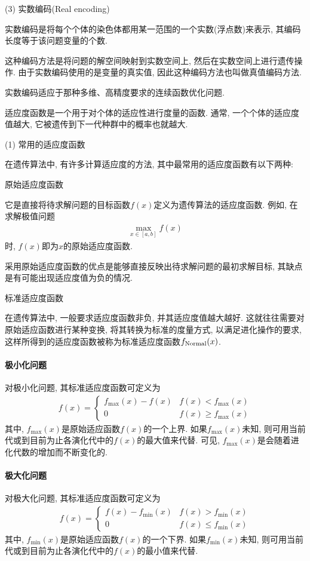  (3) 实数编码(Real encoding)


实数编码是将每个个体的染色体都用某一范围的一个实数(浮点数)来表示, 其编码长度等于该问题变量的个数.

这种编码方法是将问题的解空间映射到实数空间上, 然后在实数空间上进行遗传操作. 由于实数编码使用的是变量的真实值, 因此这种编码方法也叫做真值编码方法.

实数编码适应于那种多维、高精度要求的连续函数优化问题.

适应度函数是一个用于对个体的适应性进行度量的函数. 通常, 一个个体的适应度值越大, 它被遗传到下一代种群中的概率也就越大.

(1) 常用的适应度函数


 在遗传算法中, 有许多计算适应度的方法, 其中最常用的适应度函数有以下两种:

 原始适应度函数

 它是直接将待求解问题的目标函数$f(x)$定义为遗传算法的适应度函数. 例如, 在求解极值问题
\begin{align}
 \max _{x \in[a, b]} f(x)
\end{align}
时, $f(x)$即为$x$的原始适应度函数.

采用原始适应度函数的优点是能够直接反映出待求解问题的最初求解目标, 其缺点是有可能出现适应度值为负的情况.

 标准适应度函数

在遗传算法中, 一般要求适应度函数非负, 并其适应度值越大越好. 这就往往需要对原始适应函数进行某种变换, 将其转换为标准的度量方式, 以满足进化操作的要求, 这样所得到的适应度函数被称为标准适应度函数$f_{\textup{Normal}}(x)$.
\paragraph{极小化问题}
对极小化问题, 其标准适应度函数可定义为
\begin{align}
f(x)=
\left\{\begin{array}{ll}
{f_{\max }(x)-f(x)} &f(x)<f_{\max}(x) \\
{0} & f(x)\geq f_{\max }(x)
\end{array}
\right.
\end{align}
其中, $f_{\max}(x)$是原始适应函数$f(x)$的一个上界. 如果$f_{\max}(x)$未知, 则可用当前代或到目前为止各演化代中的$f(x)$的最大值来代替. 可见,  $f_{\max}(x)$是会随着进化代数的增加而不断变化的.
\paragraph{极大化问题}
对极大化问题, 其标准适应度函数可定义为
\begin{align}
  f(x)=\left\{
  \begin{array}{ll}
  f(x)-f_{\min }(x) &f(x)>f_{\min}(x)\\
 0 & f(x)\leq f_{\min}(x)
  \end{array}
  \right.
\end{align}
其中, $f_{\min}(x)$是原始适应函数$f(x)$的一个下界. 如果$f_{\min}(x)$未知, 则可用当前代或到目前为止各演化代中的$f(x)$的最小值来代替.

